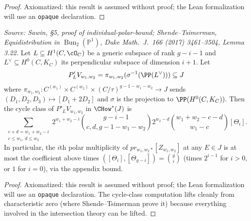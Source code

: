 \begin{proof}
  Axiomatized: this result is assumed without proof; the Lean formalization will use
  an \texttt{opaque} declaration.
\end{proof}

\begin{lemma}
  \label{lem:ts_3_22}
  \textit{Source: Sawin, §5, proof of individual-polar-bound; Shende--Tsimerman,
  \emph{Equidistribution in $\operatorname{Bun}_2(\mathbb P^1)$}, Duke Math.\ J.\
  166 (2017) 3461--3504, Lemma 3.22.}
  Let $L\subseteq H^1(C,\cO_C)$ be a generic subspace of rank $g-i-1$ and
  $L^\vee\subseteq H^0(C,K_C)$ its perpendicular subspace of dimension $i+1$.  Let
  \[ P'_L V_{w_1,w_2} = \pi_{w_1,w_2}(\sigma^{-1}(\PP(L^\vee))) \subseteq J \]
  where $\pi_{w_1,w_2}:C^{(w_1)}\times C^{(w_2)}\times(C/\tau)^{g-1-w_1-w_2}\to J$
  sends $(D_1,D_2,D_3)\mapsto [D_1+2D_2]$ and $\sigma$ is the projection to
  $\PP(H^0(C,K_C))$.  Then the cycle class of $P'_L V_{w_1,w_2}$ in $\CHow^*(J)$ is
  \[ \sum_{\substack{c+d=w_1+w_2-i\\ c\le w_1,\,d\le w_2}}
     2^{w_1+w_2-i}\binom{g-i-1}{c,d,g-1-w_1-w_2}2^{w_2-d}
     \binom{w_1+w_2-c-d}{w_1-c}[\Theta_i]. \]
  In particular, the $i$th polar multiplicity of $pr_{w_1,w_2*}[Z_{w_1,w_2}]$ at
  any $E\in J$ is at most the coefficient above times
  $([\Theta_i],[\Theta_{g-i}])=\binom{g}{i}$ (times $2^{i-1}$ for $i>0$, or $1$ for
  $i=0$), via the appendix bound.
\end{lemma}

\begin{proof}
  Axiomatized: this result is assumed without proof; the Lean formalization will use
  an \texttt{opaque} declaration.  The cycle-class computation lifts cleanly from
  characteristic zero (where Shende--Tsimerman prove it) because everything involved
  in the intersection theory can be lifted.
\end{proof}

